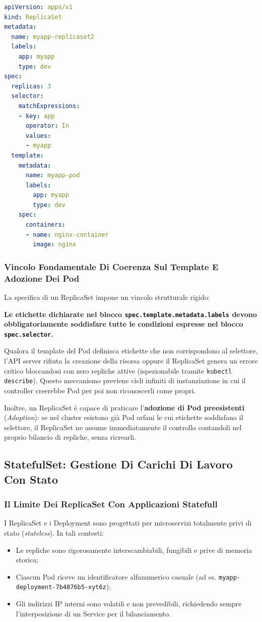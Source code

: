 \documentclass[11pt, a4paper]{article}
\begin{document}
\begin{lstlisting}[language=yaml, caption={ReplicaSet avanzato basato su selettori \texttt{matchExpressions} (\texttt{replica-set2.yml}).}]
apiVersion: apps/v1
kind: ReplicaSet
metadata:
  name: myapp-replicaset2
  labels:
    app: myapp
    type: dev
spec:
  replicas: 3
  selector:
    matchExpressions:
    - key: app
      operator: In
      values:
      - myapp
  template:
    metadata:
      name: myapp-pod
      labels:
        app: myapp
        type: dev
    spec:
      containers:
      - name: nginx-container
        image: nginx
\end{lstlisting}

\subsubsection{Vincolo Fondamentale Di Coerenza Sul Template E Adozione Dei Pod}
La specifica di un ReplicaSet impone un vincolo strutturale rigido:
\begin{center}
\textbf{Le etichette dichiarate nel blocco \texttt{spec.template.metadata.labels} devono obbligatoriamente soddisfare tutte le condizioni espresse nel blocco \texttt{spec.selector}.}
\end{center}
Qualora il template del Pod definisca etichette che non corrispondono al selettore, l'API server rifiuta la creazione della risorsa oppure il ReplicaSet genera un errore critico bloccandosi con zero repliche attive (ispezionabile tramite \texttt{kubectl describe}). Questo meccanismo previene cicli infiniti di instanziazione in cui il controller creerebbe Pod per poi non riconoscerli come propri.

Inoltre, un ReplicaSet è capace di praticare l'\textbf{adozione di Pod preesistenti} (\emph{Adoption}): se nel cluster esistono già Pod orfani le cui etichette soddisfano il selettore, il ReplicaSet ne assume immediatamente il controllo contandoli nel proprio bilancio di repliche, senza ricrearli.

\subsection{StatefulSet: Gestione Di Carichi Di Lavoro Con Stato}

\subsubsection{Il Limite Dei ReplicaSet Con Applicazioni Statefull}
I ReplicaSet e i Deployment sono progettati per microservizi totalmente privi di stato (\emph{stateless}). In tali contesti:
\begin{itemize}[noitemsep]
    \item Le repliche sono rigorosamente interscambiabili, fungibili e prive di memoria storica;
    \item Ciascun Pod riceve un identificatore alfanumerico casuale (ad es. \texttt{myapp-deployment-7b4876b5-xyt6z});
    \item Gli indirizzi IP interni sono volatili e non prevedibili, richiedendo sempre l'interposizione di un Service per il bilanciamento.
\end{itemize}
\end{document}
